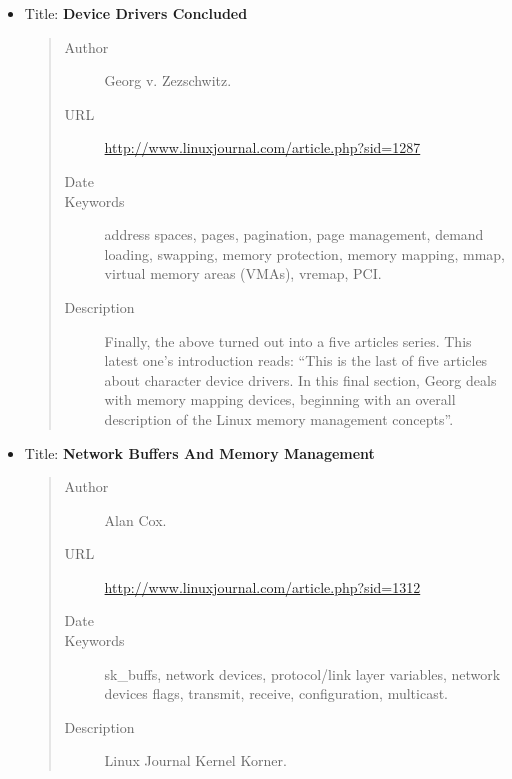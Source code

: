 \documentclass[a4paper,8pt,english]{sphinxmanual}
\begin{document}
\begin{itemize}
\begin{quote}
\begin{description}
\end{description}\end{quote}

\item {} 
Title: \textbf{Device Drivers Concluded}
\begin{quote}\begin{description}
\item[{Author}] \leavevmode
Georg v. Zezschwitz.

\item[{URL}] \leavevmode
\href{http://www.linuxjournal.com/article.php?sid=1287}{http://www.linuxjournal.com/article.php?sid=1287}

\item[{Date}] 

\item[{Keywords}] \leavevmode
address spaces, pages, pagination, page management,
demand loading, swapping, memory protection, memory mapping, mmap,
virtual memory areas (VMAs), vremap, PCI.

\item[{Description}] \leavevmode
Finally, the above turned out into a five articles
series. This latest one's introduction reads: ``This is the last of
five articles about character device drivers. In this final
section, Georg deals with memory mapping devices, beginning with
an overall description of the Linux memory management concepts''.

\end{description}\end{quote}

\item {} 
Title: \textbf{Network Buffers And Memory Management}
\begin{quote}\begin{description}
\item[{Author}] \leavevmode
Alan Cox.

\item[{URL}] \leavevmode
\href{http://www.linuxjournal.com/article.php?sid=1312}{http://www.linuxjournal.com/article.php?sid=1312}

\item[{Date}] 

\item[{Keywords}] \leavevmode
sk\_buffs, network devices, protocol/link layer
variables, network devices flags, transmit, receive,
configuration, multicast.

\item[{Description}] \leavevmode
Linux Journal Kernel Korner.


\end{description}
\end{quote}
\end{itemize}
\end{document}
